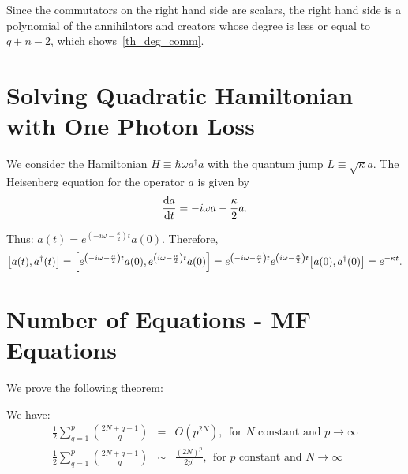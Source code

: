 Since the commutators on the right hand side are scalars, the right hand side is a polynomial of the annihilators and creators whose degree is less or equal to $q + n - 2$, which shows~\autoref{th_deg_comm}.

\section{Solving Quadratic Hamiltonian with One Photon Loss} \label{misc-quad-one-loss}

We consider the Hamiltonian $H \equiv \hbar \omega a^\dagger a$ with the quantum jump $L \equiv \sqrt{\kappa} a$. The Heisenberg equation for the operator $a$ is given by
\begin{equation}
    \dv{a}{t} = -i \omega a - \frac{\kappa}{2} a.
\end{equation}

Thus: $a(t) = e^{\left(-i \omega - \frac{\kappa}{2}\right) t} a(0)$. Therefore, 
\begin{eqnarray}
    \commutator{a(t)}{a^\dagger(t)} = \commutator{e^{\left(-i \omega - \frac{\kappa}{2}\right) t} a(0)}{e^{\left(i \omega - \frac{\kappa}{2}\right) t} a(0)} = e^{\left(-i \omega - \frac{\kappa}{2}\right) t} e^{\left(i \omega - \frac{\kappa}{2}\right) t} \commutator{a(0)}{a^\dagger(0)} = e^{- \kappa t}.
\end{eqnarray}

\section{Number of Equations - MF Equations} \label{misc-nbr-eq}

We prove the following theorem:
\begin{theorem}
    We have:
    \begin{eqnarray}
        \frac{1}{2} \sum_{q=1}^p \binom{2N+q-1}{q} &=& O(p^{2 N}), \ \ \text{for } N \text{ constant and } p \rightarrow \infty\\
        \frac{1}{2} \sum_{q=1}^p \binom{2N+q-1}{q} &\sim& \frac{(2 N)^p}{2 p!}, \ \ \text{for } p \text{ constant and } N \rightarrow \infty
    \end{eqnarray}
\end{theorem}

